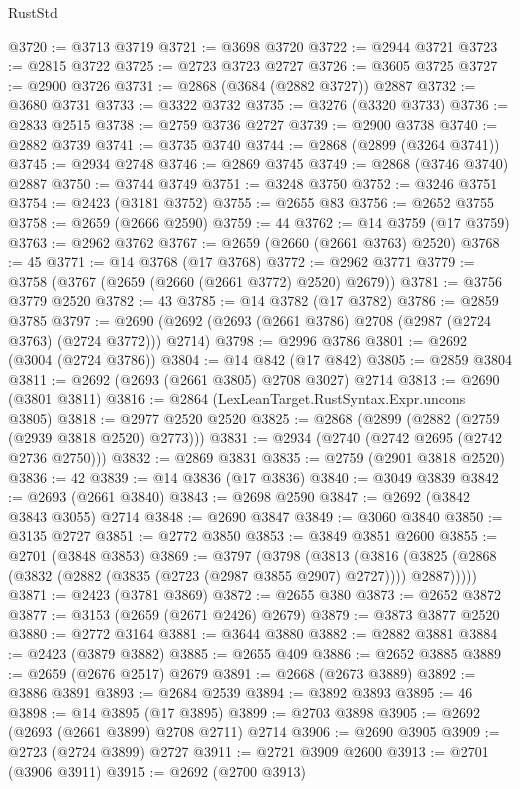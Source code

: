 \begin{lexlean}{RustStd}
\begin{coremodule}
@3720 := @3713 @3719
@3721 := @3698 @3720
@3722 := @2944 @3721
@3723 := @2815 @3722
@3725 := @2723 @3723 @2727
@3726 := @3605 @3725
@3727 := @2900 @3726
@3731 := @2868 (@3684 (@2882 @3727)) @2887
@3732 := @3680 @3731
@3733 := @3322 @3732
@3735 := @3276 (@3320 @3733)
@3736 := @2833 @2515
@3738 := @2759 @3736 @2727
@3739 := @2900 @3738
@3740 := @2882 @3739
@3741 := @3735 @3740
@3744 := @2868 (@2899 (@3264 @3741))
@3745 := @2934 @2748
@3746 := @2869 @3745
@3749 := @2868 (@3746 @3740) @2887
@3750 := @3744 @3749
@3751 := @3248 @3750
@3752 := @3246 @3751
@3754 := @2423 (@3181 @3752)
@3755 := @2655 @83
@3756 := @2652 @3755
@3758 := @2659 (@2666 @2590)
@3759 := 44
@3762 := @14 @3759 (@17 @3759)
@3763 := @2962 @3762
@3767 := @2659 (@2660 (@2661 @3763) @2520)
@3768 := 45
@3771 := @14 @3768 (@17 @3768)
@3772 := @2962 @3771
@3779 := @3758 (@3767 (@2659 (@2660 (@2661 @3772) @2520) @2679))
@3781 := @3756 @3779 @2520
@3782 := 43
@3785 := @14 @3782 (@17 @3782)
@3786 := @2859 @3785
@3797 := @2690 (@2692 (@2693 (@2661 @3786) @2708 (@2987 (@2724 @3763) (@2724 @3772))) @2714)
@3798 := @2996 @3786
@3801 := @2692 (@3004 (@2724 @3786))
@3804 := @14 @842 (@17 @842)
@3805 := @2859 @3804
@3811 := @2692 (@2693 (@2661 @3805) @2708 @3027) @2714
@3813 := @2690 (@3801 @3811)
@3816 := @2864 (LexLeanTarget.RustSyntax.Expr.uncons @3805)
@3818 := @2977 @2520 @2520
@3825 := @2868 (@2899 (@2882 (@2759 (@2939 @3818 @2520) @2773)))
@3831 := @2934 (@2740 (@2742 @2695 (@2742 @2736 @2750)))
@3832 := @2869 @3831
@3835 := @2759 (@2901 @3818 @2520)
@3836 := 42
@3839 := @14 @3836 (@17 @3836)
@3840 := @3049 @3839
@3842 := @2693 (@2661 @3840)
@3843 := @2698 @2590
@3847 := @2692 (@3842 @3843 @3055) @2714
@3848 := @2690 @3847
@3849 := @3060 @3840
@3850 := @3135 @2727
@3851 := @2772 @3850
@3853 := @3849 @3851 @2600
@3855 := @2701 (@3848 @3853)
@3869 := @3797
    (@3798
      (@3813
        (@3816 (@3825 (@2868 (@3832 (@2882 (@3835 (@2723 (@2987 @3855 @2907) @2727)))) @2887)))))
@3871 := @2423 (@3781 @3869)
@3872 := @2655 @380
@3873 := @2652 @3872
@3877 := @3153 (@2659 (@2671 @2426) @2679)
@3879 := @3873 @3877 @2520
@3880 := @2772 @3164
@3881 := @3644 @3880
@3882 := @2882 @3881
@3884 := @2423 (@3879 @3882)
@3885 := @2655 @409
@3886 := @2652 @3885
@3889 := @2659 (@2676 @2517) @2679
@3891 := @2668 (@2673 @3889)
@3892 := @3886 @3891
@3893 := @2684 @2539
@3894 := @3892 @3893
@3895 := 46
@3898 := @14 @3895 (@17 @3895)
@3899 := @2703 @3898
@3905 := @2692 (@2693 (@2661 @3899) @2708 @2711) @2714
@3906 := @2690 @3905
@3909 := @2723 (@2724 @3899) @2727
@3911 := @2721 @3909 @2600
@3913 := @2701 (@3906 @3911)
@3915 := @2692 (@2700 @3913)

\end{coremodule}
\end{lexlean}
